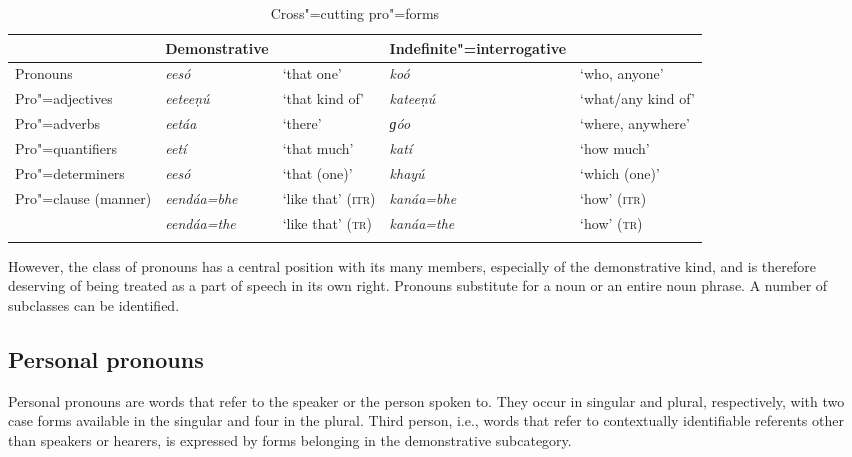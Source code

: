 \begin{table}[ht]
\caption{Cross"=cutting pro"=forms}
\begin{tabularx}{\textwidth}{ Q Q Q Q Q }
\lsptoprule
&
Demonstrative &
&
Indefinite"=interrogative &
\\\midrule
Pronouns &
\textit{eesó} &
`that one' &
\textit{koó} &
`who, anyone'\\
Pro"=adjectives &
\textit{eeteeṇú} &
`that kind of' &
\textit{kateeṇú} &
`what/any kind of' \\
Pro"=adverbs &
\textit{eetáa} &
`there' &
\textit{ɡóo} &
`where, anywhere' \\
Pro"=quantifiers &
\textit{eetí} &
`that much' &
\textit{katí} &
`how much' \\
Pro"=determiners &
\textit{eesó} &
`that (one)' &
\textit{khayú} &
`which (one)' \\
Pro"=clause (manner) &
\textit{eendáa=bhe} &
`like that' (\textsc{itr}) &
\textit{kanáa=bhe} &
`how' (\textsc{itr}) \\
&
\textit{eendáa=the} &
`like that' (\textsc{tr}) &
\textit{kanáa=the} &
`how' (\textsc{tr}) \\\lspbottomrule
\end{tabularx}
\label{tab:3b-1}
\end{table}


However, the class of pronouns has a central position with its many members, especially of the demonstrative kind, and is therefore deserving of being treated as a part of speech in its own right. Pronouns substitute for a noun or an entire noun phrase. A number of subclasses can be identified.


\subsection{Personal pronouns}
\label{subsec:3b-6-1}
Personal pronouns are words that refer to the speaker or the person spoken to. They occur in singular and plural, respectively, with two case forms available in the singular and four in the plural. Third person, i.e., words that refer to contextually identifiable referents other than speakers or hearers, is expressed by forms belonging in the demonstrative subcategory.


